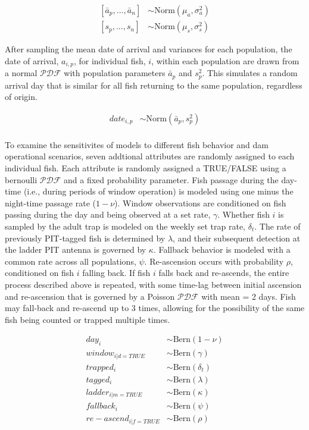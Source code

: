 \documentclass[
  12pt,
]{article}
\begin{document}
\[
\begin{aligned}
 \left[\bar{a}_p, ..., \bar{a}_n\right] &\sim \text{Norm}(\mu_a, \sigma^2_a) \\
 \left[s_p, ..., s_n\right] &\sim \text{Norm}(\mu_s, \sigma^2_s)
\end{aligned}
\]

After sampling the mean date of arrival and variances for each population, the date of arrival, \(a_{i,p}\), for individual fish, \(i\), within each population are drawn from a normal \(\mathcal{PDF}\) with population parameters \(\bar{a}_p\) and \(s^2_p\). This simulates a random arrival day that is similar for all fish returning to the same population, regardless of origin.

\[
\begin{aligned}
 date_{i,p} &\sim \text{Norm}(\bar{a}_p, s^2_p) \\
\end{aligned}
\]

To examine the sensitivites of models to different fish behavior and dam operational scenarios, seven addtional attributes are randomly assigned to each individual fish. Each attribute is randomly assigned a TRUE/FALSE using a bernoulli \(\mathcal{PDF}\) and a fixed probability parameter. Fish passage during the day-time (i.e., during periods of window operation) is modeled using one minus the night-time passage rate (\(1 - \nu\)). Window observations are conditioned on fish passing during the day and being observed at a set rate, \(\gamma\). Whether fish \(i\) is sampled by the adult trap is modeled on the weekly set trap rate, \(\delta_t\). The rate of previously PIT-tagged fish is determined by \(\lambda\), and their subsequent detection at the ladder PIT antenna is governed by \(\kappa\). Fallback behavior is modeled with a common rate across all populations, \(\psi\). Re-ascension occurs with probability \(\rho\), conditioned on fish \(i\) falling back. If fish \(i\) falls back and re-ascends, the entire process described above is repeated, with some time-lag between initial ascension and re-ascension that is governed by a Poisson \(\mathcal{PDF}\) with mean = 2 days. Fish may fall-back and re-ascend up to 3 times, allowing for the possibility of the same fish being counted or trapped multiple times.

\[
\begin{aligned}
  day_{i} &\sim \text{Bern}(1-\nu) \\
  window_{i|d = TRUE} &\sim \text{Bern}(\gamma) \\
  trapped_{i} &\sim \text{Bern}(\delta_t) \\
  tagged_{i} &\sim \text{Bern}(\lambda) \\
  ladder_{i|m = TRUE} &\sim \text{Bern}(\kappa) \\  
  fallback_{i} &\sim \text{Bern}(\psi) \\
  re-ascend_{i|f = TRUE} &\sim \text{Bern}(\rho)
\end{aligned}
\]
\end{document}
